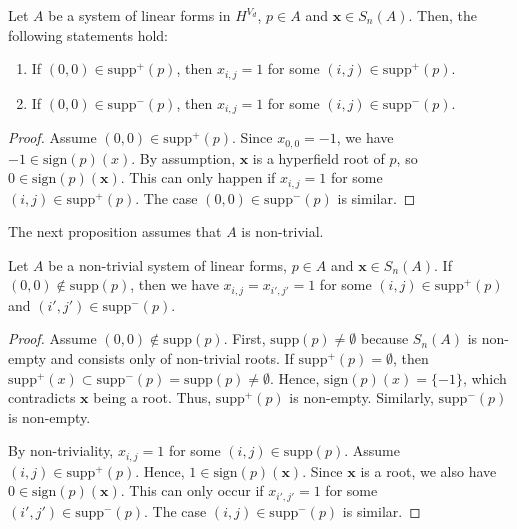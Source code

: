 \begin{proposition}
Let $A$ be a system of linear forms in \( H^{V_d} \), $p \in A$ and $\mathbf{x} \in S_{n}(A)$. Then, the following statements hold:
\begin{enumerate}
    \item If $(0,0) \in \mathrm{supp}^+(p)$, then $x_{i,j} = 1$ for some $(i,j) \in \mathrm{supp}^+(p)$. 
    \item If $(0,0) \in \mathrm{supp}^-(p)$, then $x_{i,j} = 1$ for some $(i,j) \in \mathrm{supp}^-(p)$. 
\end{enumerate}
\end{proposition}


\begin{proof}
Assume $(0,0) \in \mathrm{supp}^+(p)$. Since $x_{0,0} = -1$, we have $-1 \in \mathrm{sign}(p)(x)$. By assumption, $\mathbf{x}$ is a hyperfield root of $p$, so $0 \in \mathrm{sign}(p)(\mathbf{x})$. This can only happen if $x_{i,j} = 1$ for some $(i,j) \in \mathrm{supp}^+(p)$. The case $(0,0) \in \mathrm{supp}^-(p)$ is similar.
\end{proof}

The next proposition assumes that $A$ is non-trivial. 

\begin{proposition}
Let $A$ be a non-trivial system of linear forms, $p \in A$ and $\mathbf{x} \in S_{n}(A)$. 
If $(0,0) \notin \mathrm{supp}(p)$, then we have $x_{i,j} = x_{i',j'} = 1$ for some $(i,j) \in \mathrm{supp}^+(p)$ and $(i',j') \in \mathrm{supp}^-(p)$.
\end{proposition}

\begin{proof}
Assume $(0,0) \notin \mathrm{supp}(p)$. First, $\mathrm{supp}(p) \neq \emptyset$ because $S_{n}(A)$ is non-empty and consists only of non-trivial roots. If $\mathrm{supp}^+(p) = \emptyset$, then $\mathrm{supp}^+(x) \subset \mathrm{supp}^-(p) = \mathrm{supp}(p) \neq \emptyset$. Hence, $\mathrm{sign}(p)(x) = \{ -1 \}$, which contradicts $\mathbf{x}$ being a root. Thus, $\mathrm{supp}^+(p)$ is non-empty. Similarly, $\mathrm{supp}^-(p)$ is non-empty.

By non-triviality, $x_{i,j} = 1$ for some $(i,j) \in \mathrm{supp}(p)$. Assume $(i,j) \in \mathrm{supp}^+(p)$. Hence, $1 \in \mathrm{sign}(p)(\mathbf{x})$.  Since $\mathbf{x}$ is a root, we also have $0 \in \mathrm{sign}(p)(\mathbf{x})$. This can only occur if $x_{i',j'} = 1$ for some $(i',j') \in \mathrm{supp}^-(p)$. The case $(i,j) \in \mathrm{supp}^-(p)$ is similar. 
\end{proof}

